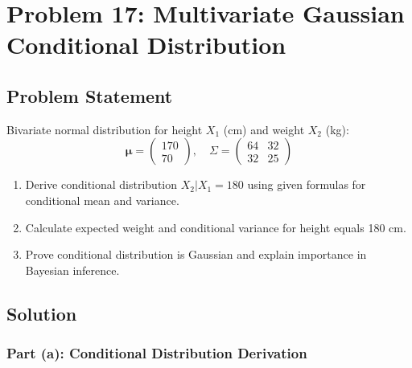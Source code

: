 \documentclass[12pt]{article}
\begin{document}
\newpage
\section{Problem 17: Multivariate Gaussian Conditional Distribution}

\subsection{Problem Statement}

Bivariate normal distribution for height $X_1$ (cm) and weight $X_2$ (kg):
\[
\boldsymbol{\mu} = \begin{pmatrix} 170 \\ 70 \end{pmatrix}, \quad
\Sigma = \begin{pmatrix} 64 & 32 \\ 32 & 25 \end{pmatrix}
\]

\begin{enumerate}
\item[(a)] Derive conditional distribution $X_2 | X_1 = 180$ using given formulas for conditional mean and variance.
\item[(b)] Calculate expected weight and conditional variance for height equals 180 cm.
\item[(c)] Prove conditional distribution is Gaussian and explain importance in Bayesian inference.
\end{enumerate}

\subsection{Solution}

\subsubsection{Part (a): Conditional Distribution Derivation}
\end{document}
